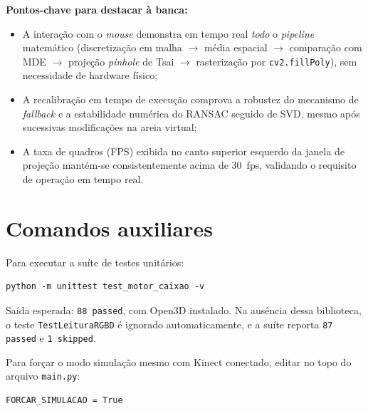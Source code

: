 \noindent
\textbf{Pontos-chave para destacar à banca:}
\begin{itemize}
    \item A interação com o \emph{mouse} demonstra em tempo real
          \emph{todo} o \textit{pipeline} matemático (discretização
          em malha $\to$ média espacial $\to$ comparação com MDE
          $\to$ projeção \textit{pinhole} de Tsai $\to$ rasterização
          por \texttt{cv2.fillPoly}), sem necessidade de
          hardware físico;
    \item A recalibração em tempo de execução comprova a robustez do
          mecanismo de \textit{fallback} e a estabilidade numérica do
          RANSAC seguido de SVD, mesmo após sucessivas modificações na
          areia virtual;
    \item A taxa de quadros (FPS) exibida no canto superior esquerdo
          da janela de projeção mantém-se consistentemente acima de
          30~fps, validando o requisito de operação em tempo real.
\end{itemize}

\section*{Comandos auxiliares}

Para executar a suíte de testes unitários:

\begin{lstlisting}
python -m unittest test_motor_caixao -v
\end{lstlisting}

\noindent Saída esperada: \texttt{88 passed}, com Open3D instalado.
Na ausência dessa biblioteca, o teste \texttt{TestLeituraRGBD} é
ignorado automaticamente, e a suíte reporta \texttt{87 passed} e
\texttt{1 skipped}.

Para forçar o modo simulação mesmo com Kinect conectado, editar no
topo do arquivo \texttt{main.py}:

\begin{lstlisting}
FORCAR_SIMULACAO = True
\end{lstlisting}
